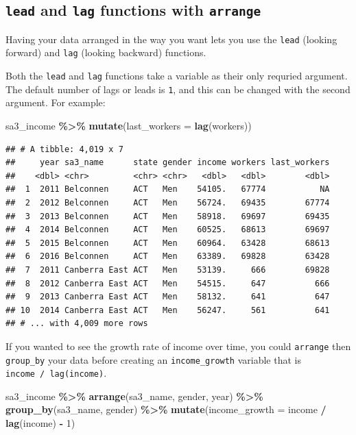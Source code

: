\documentclass[
]{book}
\newenvironment{Shaded}{\begin{snugshade}}{\end{snugshade}}
\newcommand{\DataTypeTok}[1]{\textcolor[rgb]{0.13,0.29,0.53}{#1}}
\newcommand{\DecValTok}[1]{\textcolor[rgb]{0.00,0.00,0.81}{#1}}
\newcommand{\KeywordTok}[1]{\textcolor[rgb]{0.13,0.29,0.53}{\textbf{#1}}}
\newcommand{\NormalTok}[1]{#1}
\newcommand{\OperatorTok}[1]{\textcolor[rgb]{0.81,0.36,0.00}{\textbf{#1}}}
\newcommand{\StringTok}[1]{\textcolor[rgb]{0.31,0.60,0.02}{#1}}
\begin{document}
\hypertarget{lead-and-lag-functions-with-arrange}{%
\subsection{\texorpdfstring{\texttt{lead} and \texttt{lag} functions with \texttt{arrange}}{lead and lag functions with arrange}}\label{lead-and-lag-functions-with-arrange}}

Having your data arranged in the way you want lets you use the \texttt{lead} (looking forward) and \texttt{lag} (looking backward) functions.

Both the \texttt{lead} and \texttt{lag} functions take a variable as their only requried argument. The default number of lags or leads is \texttt{1}, and this can be changed with the second argument. For example:

\begin{Shaded}
\begin{Highlighting}[]
\NormalTok{sa3\_income }\OperatorTok{\%\textgreater{}\%}
\StringTok{  }\KeywordTok{mutate}\NormalTok{(}\DataTypeTok{last\_workers =} \KeywordTok{lag}\NormalTok{(workers))}
\end{Highlighting}
\end{Shaded}

\begin{verbatim}
## # A tibble: 4,019 x 7
##     year sa3_name      state gender income workers last_workers
##    <dbl> <chr>         <chr> <chr>   <dbl>   <dbl>        <dbl>
##  1  2011 Belconnen     ACT   Men    54105.   67774           NA
##  2  2012 Belconnen     ACT   Men    56724.   69435        67774
##  3  2013 Belconnen     ACT   Men    58918.   69697        69435
##  4  2014 Belconnen     ACT   Men    60525.   68613        69697
##  5  2015 Belconnen     ACT   Men    60964.   63428        68613
##  6  2016 Belconnen     ACT   Men    63389.   69828        63428
##  7  2011 Canberra East ACT   Men    53139.     666        69828
##  8  2012 Canberra East ACT   Men    54515.     647          666
##  9  2013 Canberra East ACT   Men    58132.     641          647
## 10  2014 Canberra East ACT   Men    56247.     561          641
## # ... with 4,009 more rows
\end{verbatim}

If you wanted to see the growth rate of income over time, you could \texttt{arrange} then \texttt{group\_by} your data before creating an \texttt{income\_growth} variable that is \texttt{income\ /\ lag(income)}.

\begin{Shaded}
\begin{Highlighting}[]
\NormalTok{sa3\_income }\OperatorTok{\%\textgreater{}\%}
\StringTok{  }\KeywordTok{arrange}\NormalTok{(sa3\_name, gender, year) }\OperatorTok{\%\textgreater{}\%}\StringTok{ }
\StringTok{  }\KeywordTok{group\_by}\NormalTok{(sa3\_name, gender) }\OperatorTok{\%\textgreater{}\%}\StringTok{ }
\StringTok{  }\KeywordTok{mutate}\NormalTok{(}\DataTypeTok{income\_growth =}\NormalTok{ income }\OperatorTok{/}\StringTok{ }\KeywordTok{lag}\NormalTok{(income) }\OperatorTok{{-}}\StringTok{ }\DecValTok{1}\NormalTok{)}
\end{Highlighting}
\end{Shaded}
\end{document}

